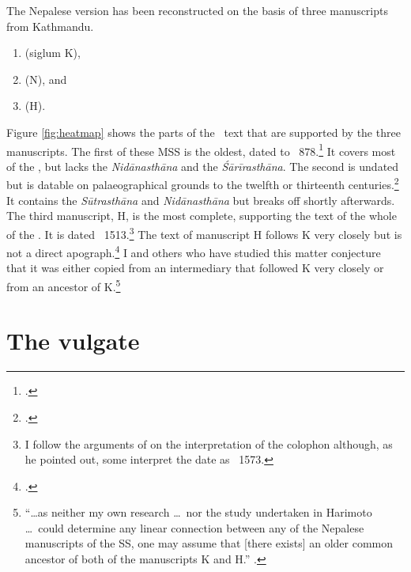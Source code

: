 The Nepalese version has been reconstructed on the basis of three
manuscripts from Kathmandu.  
    \begin{enumerate}
        \item {} (siglum K),
        \item {} (N), and
        \item {} (H).
    \end{enumerate}
    Figure \ref{fig:heatmap} shows the parts of the \SS\ text that are
supported by the three manuscripts. The first of these MSS is the
oldest, dated to \CE~878.\footcite[15]{kleb-2021b}  It covers most
of the \SS, but lacks the \emph{Nidānasthāna} and the
\emph{Śārīrasthāna}.  The second is undated but is datable on
palaeographical grounds to the twelfth or thirteenth
centuries.\footcite[17--18]{kleb-2021b} It contains the
\emph{Sūtrasthāna} and \emph{Nidānasthāna} but breaks off shortly
afterwards.  The third manuscript, H, is the most complete,
supporting the text of the whole of the \SS. It is dated
\CE~1513.\footnote{I follow the arguments of
    \citet[21--26]{kleb-2021b} on the interpretation of the colophon
    although, as he pointed out, some interpret the date as \CE\
    1573.} %
    The text of manuscript H follows K very closely but is not a
    direct apograph.\footcite{chak-2022} I and others who have studied
    this matter conjecture that it was either copied from an
    intermediary that followed K very closely or from an ancestor of
    K.\footnote{“\ldots as neither my own research \ldots\ nor the
        study undertaken in Harimoto \ldots\ could determine any linear
        connection between any of the Nepalese manuscripts of the SS, one
        may assume that [there exists] an older common ancestor of both of
        the manuscripts K and H.” \citep[21]{kleb-2021a}.}
        
 
     
     
       
\section{The vulgate}

